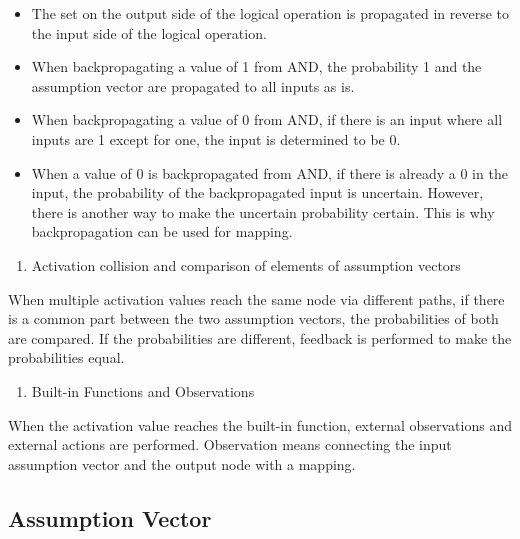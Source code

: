 \documentclass[12pt]{article}
\begin{document}
\begin{itemize}

\item
  The set on the output side of the logical operation is propagated in
  reverse to the input side of the logical operation.
\item
  When backpropagating a value of 1 from AND, the probability 1 and the
  assumption vector are propagated to all inputs as is.
\item
  When backpropagating a value of 0 from AND, if there is an input where
  all inputs are 1 except for one, the input is determined to be 0.
\item
  When a value of 0 is backpropagated from AND, if there is already a 0
  in the input, the probability of the backpropagated input is
  uncertain. However, there is another way to make the uncertain
  probability certain. This is why backpropagation can be used for
  mapping.
\end{itemize}

\begin{enumerate}
\def\labelenumi{\arabic{enumi}.}
\setcounter{enumi}{3}

\item
  Activation collision and comparison of elements of assumption vectors
\end{enumerate}

When multiple activation values \hspace{0pt}\hspace{0pt}reach the same
node via different paths, if there is a common part between the two
assumption vectors, the probabilities of both are compared. If the
probabilities are different, feedback is performed to make the
probabilities equal.

\begin{enumerate}
\def\labelenumi{\arabic{enumi}.}
\setcounter{enumi}{4}

\item
  Built-in Functions and Observations
\end{enumerate}

When the activation value reaches the built-in function, external
observations and external actions are performed. Observation means
connecting the input assumption vector and the output node with a
mapping.

\subsection{Assumption Vector}\label{assumption-vector}
\end{document}
